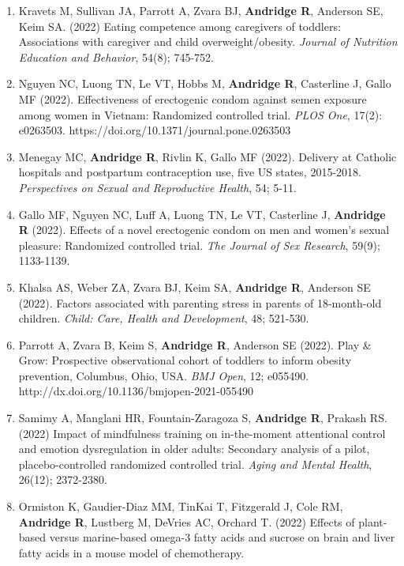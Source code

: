 \documentclass[
  english,
  letterpaper,
  DIV=11,
  numbers=noendperiod]{scrartcl}
\begin{document}
\begin{enumerate}
  Chemotherapy, obesity, and fitness make a difference. \emph{Brain,
  Behavior, and Immunity}, 103; 1-9.
\item
  Kravets M, Sullivan JA, Parrott A, Zvara BJ, \textbf{Andridge R},
  Anderson SE, Keim SA. (2022) Eating competence among caregivers of
  toddlers: Associations with caregiver and child overweight/obesity.
  \emph{Journal of Nutrition Education and Behavior}, 54(8); 745-752.
\item
  Nguyen NC, Luong TN, Le VT, Hobbs M, \textbf{Andridge R}, Casterline
  J, Gallo MF (2022). Effectiveness of erectogenic condom against semen
  exposure among women in Vietnam: Randomized controlled trial.
  \emph{PLOS One}, 17(2): e0263503.
  https://doi.org/10.1371/journal.pone.0263503
\item
  Menegay MC, \textbf{Andridge R}, Rivlin K, Gallo MF (2022). Delivery
  at Catholic hospitals and postpartum contraception use, five US
  states, 2015-2018. \emph{Perspectives on Sexual and Reproductive
  Health}, 54; 5-11.
\item
  Gallo MF, Nguyen NC, Luff A, Luong TN, Le VT, Casterline J,
  \textbf{Andridge R} (2022). Effects of a novel erectogenic condom on
  men and women's sexual pleasure: Randomized controlled trial.
  \emph{The Journal of Sex Research}, 59(9); 1133-1139.
\item
  Khalsa AS, Weber ZA, Zvara BJ, Keim SA, \textbf{Andridge R}, Anderson
  SE (2022). Factors associated with parenting stress in parents of
  18-month-old children. \emph{Child: Care, Health and Development}, 48;
  521-530.
\item
  Parrott A, Zvara B, Keim S, \textbf{Andridge R}, Anderson SE (2022).
  Play \& Grow: Prospective observational cohort of toddlers to inform
  obesity prevention, Columbus, Ohio, USA. \emph{BMJ Open}, 12; e055490.
  http://dx.doi.org/10.1136/bmjopen-2021-055490
\item
  Samimy A, Manglani HR, Fountain-Zaragoza S, \textbf{Andridge R},
  Prakash RS. (2022) Impact of mindfulness training on in-the-moment
  attentional control and emotion dysregulation in older adults:
  Secondary analysis of a pilot, placebo-controlled randomized
  controlled trial. \emph{Aging and Mental Health}, 26(12); 2372-2380.
\item
  Ormiston K, Gaudier-Diaz MM, TinKai T, Fitzgerald J, Cole RM,
  \textbf{Andridge R}, Lustberg M, DeVries AC, Orchard T. (2022) Effects
  of plant-based versus marine-based omega-3 fatty acids and sucrose on
  brain and liver fatty acids in a mouse model of chemotherapy.

\end{enumerate}
\end{document}
